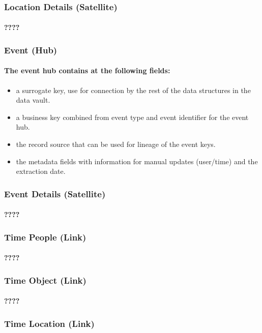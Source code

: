 \subsubsection{Location Details (Satellite)}
\paragraph{????}
\subsubsection{Event (Hub)}
\paragraph{The event hub contains at the following fields:}
\begin{itemize}
  \item{a surrogate key, use for connection by the rest of the data structures in the data vault.}
  \item{a business key combined from event type and event identifier for the event hub.}
  \item{the record source that can be used for lineage of the event keys.}
  \item{the metadata fields with information for manual updates (user/time) and the extraction date.}
\end{itemize}
\subsubsection{Event Details (Satellite)}
\paragraph{????}
\subsubsection{Time People (Link)}
\paragraph{????}
\subsubsection{Time Object (Link)}
\paragraph{????}
\subsubsection{Time Location (Link)}
